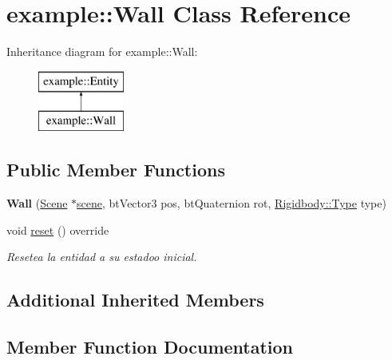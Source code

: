\hypertarget{classexample_1_1_wall}{}\section{example\+::Wall Class Reference}
\label{classexample_1_1_wall}
Inheritance diagram for example\+::Wall\+:\begin{figure}[H]
\begin{center}
\leavevmode
\includegraphics[height=2.000000cm]{classexample_1_1_wall}
\end{center}
\end{figure}
\subsection*{Public Member Functions}
\begin{DoxyCompactItemize}
\item 
\mbox{\label{classexample_1_1_wall_a92a0433671e055888d6bcfb5883e92f0}} 
{\bfseries Wall} (\mbox{\hyperlink{classexample_1_1_scene}{Scene}} $\ast$\mbox{\hyperlink{classexample_1_1_entity_ab851dbde4a16829f9fb77ab9a66b9f1e}{scene}}, bt\+Vector3 pos, bt\+Quaternion rot, \mbox{\hyperlink{classexample_1_1_rigidbody_a527ee68e1748a5a6014b7fcbe9f86e3d}{Rigidbody\+::\+Type}} type)
\item 
void \mbox{\hyperlink{classexample_1_1_wall_a41f0246b24c58e2f7adf6be5284dccd4}{reset}} () override
\begin{DoxyCompactList}\small\item\em Resetea la entidad a su estadoo inicial. \end{DoxyCompactList}\end{DoxyCompactItemize}
\subsection*{Additional Inherited Members}


\subsection{Member Function Documentation}
\mbox{\label{classexample_1_1_wall_a41f0246b24c58e2f7adf6be5284dccd4}} 
